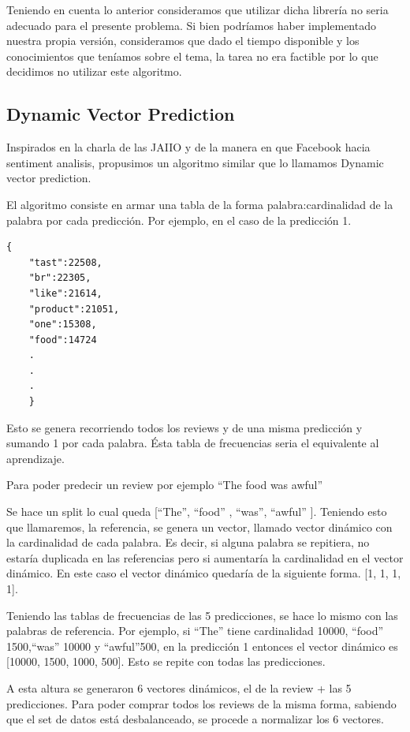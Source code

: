 \documentclass[10pt,a4paper]{article}
\begin{document}
Teniendo en cuenta lo anterior consideramos que utilizar dicha librería no seria adecuado para el presente problema. Si bien podríamos haber implementado nuestra propia versión, consideramos que dado el tiempo disponible y los conocimientos que teníamos sobre el tema, la tarea no era factible por lo que decidimos no utilizar este algoritmo.

\subsection{Dynamic Vector Prediction}

Inspirados en la charla de las JAIIO y de la manera en que Facebook hacia sentiment analisis, propusimos un algoritmo similar que lo llamamos Dynamic vector prediction.

El algoritmo consiste en armar una tabla de la forma palabra:cardinalidad de la palabra por cada predicción. Por ejemplo, en el caso de la predicción 1.

\begin{lstlisting}[firstnumber=1]
    {
    "tast":22508,
    "br":22305,
    "like":21614,
    "product":21051,
    "one":15308,
    "food":14724
    .
    .
    .
    }
\end{lstlisting}

Esto se genera recorriendo todos los reviews y de una misma predicción y sumando 1 por cada palabra. Ésta tabla de frecuencias seria el equivalente al aprendizaje.

Para poder predecir un review por ejemplo ``The food was awful'' 

Se hace un split lo cual queda [``The'', ``food'' ,  ``was'',  ``awful'' ]. Teniendo esto que llamaremos, la referencia, se genera un vector, llamado vector dinámico con la cardinalidad de cada palabra. Es decir, si alguna palabra se repitiera, no estaría duplicada en las referencias pero si aumentaría la cardinalidad en el vector dinámico. En este caso el vector dinámico quedaría de la siguiente forma. [1, 1, 1, 1]. 

Teniendo las tablas de frecuencias de las 5 predicciones, se hace lo mismo con las palabras de referencia. Por ejemplo, si ``The'' tiene cardinalidad 10000, ``food'' 1500,``was'' 10000 y ``awful''500, en la predicción 1 entonces el vector dinámico es [10000, 1500, 1000, 500]. Esto se repite con todas las predicciones.

A esta altura se generaron 6 vectores dinámicos, el de la review + las 5 predicciones. Para poder comprar todos los reviews de la misma forma, sabiendo que el set de datos está desbalanceado, se procede a normalizar los 6 vectores.
\end{document}
